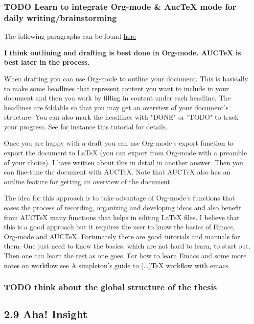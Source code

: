 \documentclass[11pt]{article}
\begin{document}
\subsubsection*{{\bfseries\sffamily TODO} Learn to integrate Org-mode \& AucTeX mode for daily writing/brainstorming}
\label{sec:orgheadline98}
The following paragraphs can be found \href{http://tex.stackexchange.com/questions/22431/everyday-latex-and-workflow/22443#22443}{here}

\textbf{I think outlining and drafting is best done in Org-mode. AUCTeX is best later in the process.}

When drafting you can use Org-mode to outline your document. This is basically
to make some headlines that represent content you want to include in your
document and then you work by filling in content under each headline. The
headlines are foldable so that you may get an overview of your document's
structure. You can also mark the headlines with "DONE" or "TODO" to track your
progress. See for instance this tutorial for details.

Once you are happy with a draft you can use Org-mode's export function to export
the document to \LaTeX{} (you can export from Org-mode with a preamble of your
choice). I have written about this in detail in another answer. Then you can
fine-tune the document with AUCTeX. Note that AUCTeX also has an outline feature
for getting an overview of the document.

The idea for this approach is to take advantage of Org-mode's functions that
eases the process of recording, organizing and developing ideas and also benefit
from AUCTeX many functions that helps in editing \LaTeX{} files. I believe that
this is a good approach but it requires the user to know the basics of Emacs,
Org-mode and AUCTeX. Fortunately there are good tutorials and manuals for them.
One just need to know the basics, which are not hard to learn, to start out.
Then one can learn the rest as one goes. For how to learn Emacs and some more
notes on workflow see A simpleton's guide to (\ldots{})\TeX{} workflow with emacs.
\subsubsection*{{\bfseries\sffamily TODO} think about the global structure of the \textbf{thesis}}
\label{sec:orgheadline99}
\subsection*{2.9 \textbf{Aha! Insight}}
\label{sec:orgheadline101}
\end{document}

